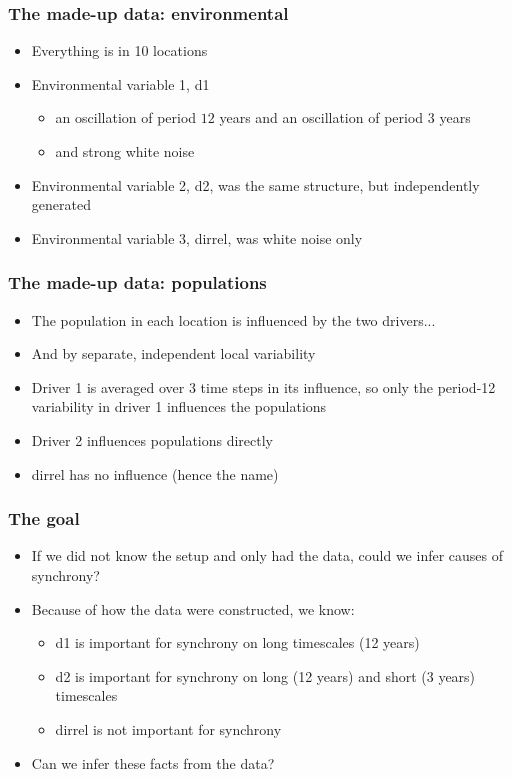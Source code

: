 \documentclass{beamer}
\begin{document}
\begin{frame}
\frametitle{The made-up data: environmental}
\begin{itemize}
\item Everything is in 10 locations
\item Environmental variable 1, d1
\begin{itemize}
\item an oscillation of period $12$ years and an oscillation of period $3$ years
\item and strong white noise
\end{itemize}
\item Environmental variable 2, d2, was the same structure, but independently generated
\item Environmental variable 3, dirrel, was white noise only
\end{itemize}
\end{frame}

\begin{frame}
\frametitle{The made-up data: populations}
\begin{itemize}
\item The population in each location is influenced by the two drivers...
\item And by separate, independent local variability
\item Driver 1 is averaged over 3 time steps in its influence, so
only the period-12 variability in driver 1 influences the populations
\item Driver 2 influences populations directly
\item dirrel has no influence (hence the name)
\end{itemize}
\end{frame}

\begin{frame}
\frametitle{The goal}
\begin{itemize}
\item If we did not know the setup and only had the data, could we infer causes of synchrony?
\item Because of how the data were constructed, we know:
\begin{itemize}
\item d1 is important for synchrony on long timescales (12 years)
\item d2 is important for synchrony on long (12 years) and short (3 years) timescales
\item dirrel is not important for synchrony
\end{itemize}
\item Can we infer these facts from the data?
\end{itemize}
\end{frame}
\end{document}
